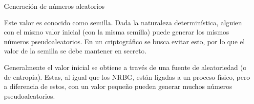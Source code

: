 \begin{frame}{Generación de números aleatorios}
\begin{itemize}
    {
      Este valor es conocido como semilla.
      Dada la naturaleza determinística, alguien con el mismo valor inicial (con
      la misma semilla) puede generar los mismos números pseudoaleatorios. En un
      criptográfico se busca evitar esto, por lo que el valor de la semilla se
      debe mantener en secreto.

      Generalmente el valor inicial se obtiene a través de una fuente de
      aleatoriedad (o de entropia). Estas, al igual que los NRBG, están ligadas
      a un proceso físico, pero a diferencia de estos, con un valor pequeño
      pueden generar muchos números pseudoaleatorios.
    }

  \end{itemize}

\end{frame}

